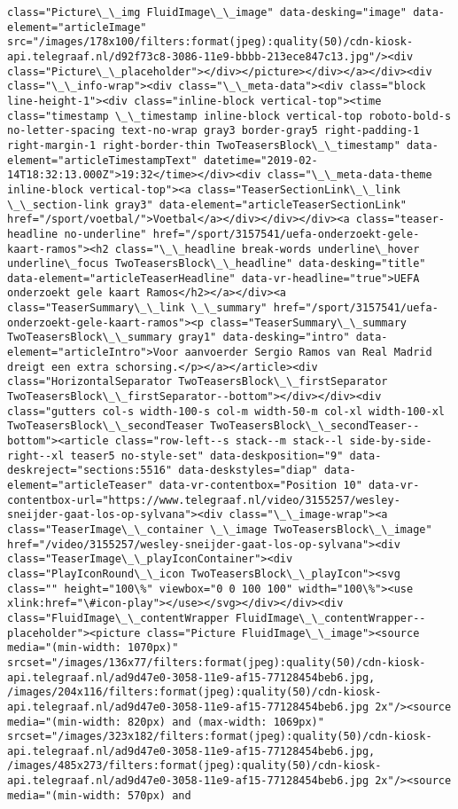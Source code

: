 \documentclass[11pt]{article}
\begin{document}
\begin{Verbatim}[commandchars=\\\{\}]
class="Picture\_\_img FluidImage\_\_image" data-desking="image" data-element="articleImage" src="/images/178x100/filters:format(jpeg):quality(50)/cdn-kiosk-api.telegraaf.nl/d92f73c8-3086-11e9-bbbb-213ece847c13.jpg"/><div class="Picture\_\_placeholder"></div></picture></div></a></div><div class="\_\_info-wrap"><div class="\_\_meta-data"><div class="block line-height-1"><div class="inline-block vertical-top"><time class="timestamp \_\_timestamp inline-block vertical-top roboto-bold-s no-letter-spacing text-no-wrap gray3 border-gray5 right-padding-1 right-margin-1 right-border-thin TwoTeasersBlock\_\_timestamp" data-element="articleTimestampText" datetime="2019-02-14T18:32:13.000Z">19:32</time></div><div class="\_\_meta-data-theme inline-block vertical-top"><a class="TeaserSectionLink\_\_link \_\_section-link gray3" data-element="articleTeaserSectionLink" href="/sport/voetbal/">Voetbal</a></div></div></div><a class="teaser-headline no-underline" href="/sport/3157541/uefa-onderzoekt-gele-kaart-ramos"><h2 class="\_\_headline break-words underline\_hover underline\_focus TwoTeasersBlock\_\_headline" data-desking="title" data-element="articleTeaserHeadline" data-vr-headline="true">UEFA onderzoekt gele kaart Ramos</h2></a></div><a class="TeaserSummary\_\_link \_\_summary" href="/sport/3157541/uefa-onderzoekt-gele-kaart-ramos"><p class="TeaserSummary\_\_summary TwoTeasersBlock\_\_summary gray1" data-desking="intro" data-element="articleIntro">Voor aanvoerder Sergio Ramos van Real Madrid dreigt een extra schorsing.</p></a></article><div class="HorizontalSeparator TwoTeasersBlock\_\_firstSeparator TwoTeasersBlock\_\_firstSeparator--bottom"></div></div><div class="gutters col-s width-100-s col-m width-50-m col-xl width-100-xl TwoTeasersBlock\_\_secondTeaser TwoTeasersBlock\_\_secondTeaser--bottom"><article class="row-left--s stack--m stack--l side-by-side-right--xl teaser5 no-style-set" data-deskposition="9" data-deskreject="sections:5516" data-deskstyles="diap" data-element="articleTeaser" data-vr-contentbox="Position 10" data-vr-contentbox-url="https://www.telegraaf.nl/video/3155257/wesley-sneijder-gaat-los-op-sylvana"><div class="\_\_image-wrap"><a class="TeaserImage\_\_container \_\_image TwoTeasersBlock\_\_image" href="/video/3155257/wesley-sneijder-gaat-los-op-sylvana"><div class="TeaserImage\_\_playIconContainer"><div class="PlayIconRound\_\_icon TwoTeasersBlock\_\_playIcon"><svg class="" height="100\%" viewbox="0 0 100 100" width="100\%"><use xlink:href="\#icon-play"></use></svg></div></div><div class="FluidImage\_\_contentWrapper FluidImage\_\_contentWrapper--placeholder"><picture class="Picture FluidImage\_\_image"><source media="(min-width: 1070px)" srcset="/images/136x77/filters:format(jpeg):quality(50)/cdn-kiosk-api.telegraaf.nl/ad9d47e0-3058-11e9-af15-77128454beb6.jpg, /images/204x116/filters:format(jpeg):quality(50)/cdn-kiosk-api.telegraaf.nl/ad9d47e0-3058-11e9-af15-77128454beb6.jpg 2x"/><source media="(min-width: 820px) and (max-width: 1069px)" srcset="/images/323x182/filters:format(jpeg):quality(50)/cdn-kiosk-api.telegraaf.nl/ad9d47e0-3058-11e9-af15-77128454beb6.jpg, /images/485x273/filters:format(jpeg):quality(50)/cdn-kiosk-api.telegraaf.nl/ad9d47e0-3058-11e9-af15-77128454beb6.jpg 2x"/><source media="(min-width: 570px) and 
\end{Verbatim}
\end{document}
